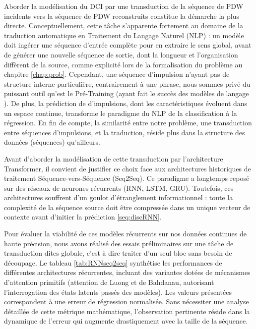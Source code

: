 Aborder la modélisation du DCI par une transduction de la séquence de PDW incidents vers la séquence de PDW reconstruits constitue la démarche la plus directe. Conceptuellement, cette tâche s'apparente fortement au domaine de la traduction automatique en Traitement du Langage Naturel (NLP) : un modèle doit ingérer une séquence d'entrée complète pour en extraire le sens global, avant de générer une nouvelle séquence de sortie, dont la longueur et l'organisation diffèrent de la source, comme explicité lors de la formalisation du problème au chapitre \ref{chap:prob}. Cependant, une séquence d'impulsion n'ayant pas de structure interne particulière, contrairement à une phrase,  nous sommes privé du puissant outil qu'est le Pré-Training (ayant fait le succès des modèles de langage \cite{radford_improving_2018}). De plus, la prédiction de d'impulsions, dont les caractéristiques évoluent dans un espace continue, transforme le paradigme du NLP de la classification à la régression. En fin de compte, la similarité entre notre problème, une transduction entre séquences d'impulsions, et la traduction, réside plus dans la structure des données (séquences) qu'ailleurs.

Avant d'aborder la modélisation de cette transduction par l'architecture Transformer, il convient de justifier ce choix face aux architectures historiques de traitement Séquence-vers-Séquence (Seq2Seq). Ce paradigme a longtemps reposé sur des réseaux de neurones récurrents (RNN, LSTM, GRU). Toutefois, ces architectures souffrent d'un goulot d'étranglement informationnel : toute la complexité de la séquence source doit être compressée dans un unique vecteur de contexte avant d'initier la prédiction \ref{seq:discRNN}.

Pour évaluer la viabilité de ces modèles récurrents sur nos données continues de haute précision, nous avons réalisé des essais préliminaires sur une tâche de transduction dites globale, c'est à dire traiter d'un seul bloc sans besoin de découpage. Le tableau \ref{tab:RNNseq2seq} synthétise les performances de différentes architectures récurrentes, incluant des variantes dotées de mécanismes d'attention primitifs (attention de Luong et de Bahdanau, autorisant l'interrogation des états latents passés des  modèles). Les valeurs présentées correspondent à une erreur de régression normalisée. Sans nécessiter une analyse détaillée de cette métrique mathématique, l'observation pertinente réside dans la dynamique de l'erreur qui augmente drastiquement avec la taille de la séquence.

